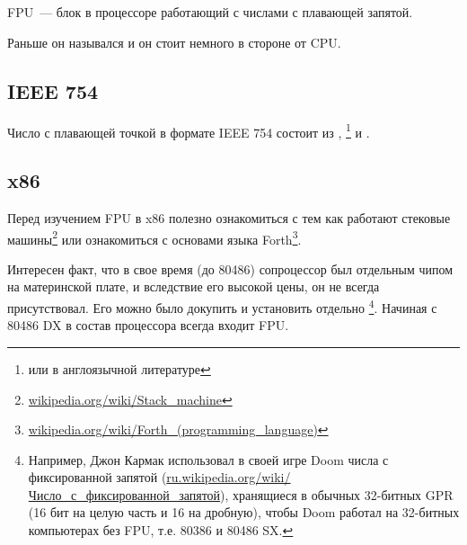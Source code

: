 \chapter{\FPUChapterName}
\label{sec:FPU}

\newcommand{\FNURLSTACK}{\footnote{\href{http://go.yurichev.com/17123}{wikipedia.org/wiki/Stack\_machine}}}
\newcommand{\FNURLFORTH}{\footnote{\href{http://go.yurichev.com/17124}{wikipedia.org/wiki/Forth\_(programming\_language)}}}
\newcommand{\FNURLIEEE}{\footnote{\href{http://go.yurichev.com/17125}{wikipedia.org/wiki/IEEE\_floating\_point}}}
\newcommand{\FNURLSP}{\footnote{\href{http://go.yurichev.com/17126}{wikipedia.org/wiki/Single-precision\_floating-point\_format}}}
\newcommand{\FNURLDP}{\footnote{\href{http://go.yurichev.com/17127}{wikipedia.org/wiki/Double-precision\_floating-point\_format}}}
\newcommand{\FNURLEP}{\footnote{\href{http://go.yurichev.com/17128}{wikipedia.org/wiki/Extended\_precision}}}

\ac{FPU}~--- блок в процессоре работающий с числами с плавающей запятой.

Раньше он назывался  и он стоит немного в стороне от \ac{CPU}.

\section{IEEE 754}

Число с плавающей точкой в формате IEEE 754 состоит из , \footnote{ или  
в англоязычной литературе} и .

\section{x86}

Перед изучением \ac{FPU} в x86 полезно ознакомиться с тем как работают стековые машины\FNURLSTACK 
или ознакомиться с основами языка Forth\FNURLFORTH.

Интересен факт, что в свое время (до 80486) сопроцессор был отдельным чипом на материнской плате, 
и вследствие его высокой цены, он не всегда присутствовал. Его можно было докупить и установить отдельно
\footnote{Например, Джон Кармак использовал в своей игре Doom числа с фиксированной запятой 
(\href{http://go.yurichev.com/17357}{ru.wikipedia.org/wiki/Число\_с\_фиксированной\_запятой}), хранящиеся
в обычных 32-битных \ac{GPR} (16 бит на целую часть и 16 на дробную),
чтобы Doom работал на 32-битных компьютерах без FPU, т.е. 80386 и 80486 SX.}.
Начиная с 80486 DX в состав процессора всегда входит FPU.

